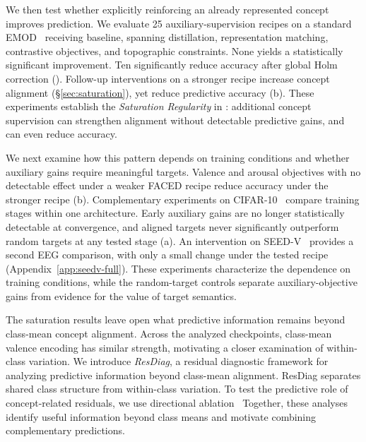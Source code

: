 We then test whether explicitly reinforcing an already represented concept improves prediction. We evaluate 25 auxiliary-supervision recipes on a standard EMOD~\citep{chen2025emod} receiving baseline, spanning distillation, representation matching, contrastive objectives, and topographic constraints. None yields a statistically significant improvement. Ten significantly reduce accuracy after global Holm correction (). Follow-up interventions on a stronger recipe increase concept alignment (\S\ref{sec:saturation}), yet reduce predictive accuracy (b). These experiments establish the \emph{Saturation Regularity} in : additional concept supervision can strengthen alignment without detectable predictive gains, and can even reduce accuracy.

We next examine how this pattern depends on training conditions and whether auxiliary gains require meaningful targets. Valence and arousal objectives with no detectable effect under a weaker FACED recipe reduce accuracy under the stronger recipe (b). Complementary experiments on CIFAR-10~\citep{krizhevsky2009cifar} compare training stages within one architecture. Early auxiliary gains are no longer statistically detectable at convergence, and aligned targets never significantly outperform random targets at any tested stage (a). An intervention on SEED-V~\citep{liu2022seedv} provides a second EEG comparison, with only a small change under the tested recipe (Appendix~\ref{app:seedv-full}). These experiments characterize the dependence on training conditions, while the random-target controls separate auxiliary-objective gains from evidence for the value of target semantics.

The saturation results leave open what predictive information remains beyond class-mean concept alignment. Across the analyzed checkpoints, class-mean valence encoding has similar strength, motivating a closer examination of within-class variation. We introduce \emph{ResDiag}, a residual diagnostic framework for analyzing predictive information beyond class-mean alignment. ResDiag separates shared class structure from within-class variation. To test the predictive role of concept-related residuals, we use directional ablation~\citep{arditi2024refusal}  Together, these analyses identify useful information beyond class means and motivate combining complementary predictions.

